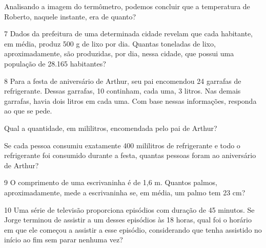 Analisando a imagem do termômetro, podemos concluir que a temperatura de
Roberto, naquele instante, era de quanto?

\bigskip

\num{7} Dados da prefeitura de uma determinada cidade revelam que cada
habitante, em média, produz 500 g de lixo por dia. Quantas toneladas de lixo,
aproximadamente, são produzidas, por dia, nessa cidade, que
possui uma população de 28.165 habitantes?

\begin{mdframed}[linewidth=2pt,linecolor=salmao]
\mbox{}\vspace*{3cm}
\end{mdframed}

\pagebreak

\num{8} Para a festa de aniversário de Arthur, seu pai encomendou 24
garrafas de refrigerante. Dessas garrafas, 10 continham, cada uma, 3
litros. Nas demais garrafas, havia dois litros em cada uma. Com base
nessas informações, responda ao que se pede.

\begin{escolha}
\item
  Qual a quantidade, em mililitros, encomendada pelo pai de Arthur?

\bigskip
\bigskip

\item
  Se cada pessoa consumiu exatamente 400 mililitros de refrigerante e
  todo o refrigerante foi consumido durante a festa, quantas pessoas
  foram ao aniversário de Arthur?

\bigskip
\end{escolha}


\num{9} O comprimento de uma escrivaninha é de 1,6 m. Quantos palmos,
aproximadamente, mede a escrivaninha se, em média, um palmo tem 23 cm?

\bigskip\bigskip\bigskip

\num{10} Uma série de televisão proporciona episódios com duração de 45
minutos. Se Jorge terminou de assistir a um desses episódios às 18 horas, qual
foi o horário em que ele começou a assistir a esse episódio, considerando que tenha assistido
no início ao fim sem parar nenhuma vez?

